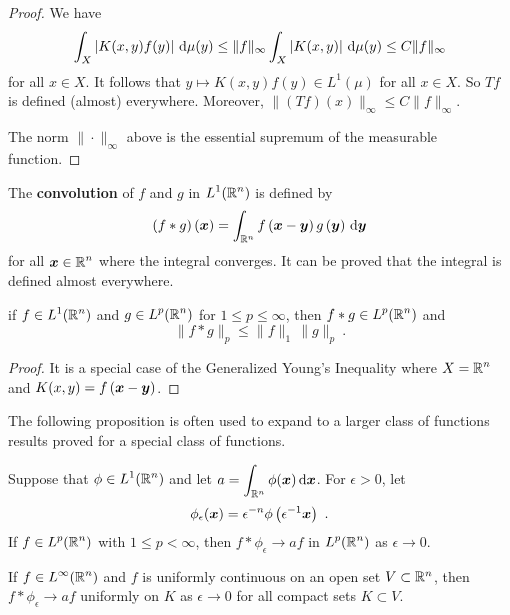 \begin{proof}
 We have
\[
\int_X \left| K(x,y)f(y)\right| \,\mathrm{d}{\mu(y)}
\leq \|f\|_\infty \int_X \left| K(x,y)\right| \,\mathrm{d}{\mu(y)}
\leq C \|f\|_\infty
\]
for all $x\in X$.
It follows that $\displaystyle y \mapsto K(x,y)f(y) \in L^1(\mu)$ for
all $x\in X$.  So $Tf$ is defined (almost) everywhere.  Moreover,
$\displaystyle \| (Tf)(x)\|_\infty \leq C \| f\|_\infty$.

The norm $\| \cdot \|_\infty$ above is the essential supremum of the
measurable function.
\end{proof}

The {\bfseries convolution} of $f$ and $g$ in
$\displaystyle L^1(\mathbb{R}^n)$ is defined by
\[
(f\ast g)\left({\bm{x}}\right) = \int_{\mathbb{R}^n}
f\left({\bm{x}} - {\bm{y}}\right)  g\left({\bm{y}}\right) \,\mathrm{d}{{\bm{y}}}
\]
for all $\displaystyle {\bm{x}} \in \mathbb{R}^n$ where the integral
converges.  It can be proved that the integral is defined almost
everywhere.

\begin{theorem} \label{distr_sp_young}
if $\displaystyle f \in L^1(\mathbb{R}^n)$ and $\displaystyle g\in L^p(\mathbb{R}^n)$
for $1\leq p \leq \infty$, then $\displaystyle f\ast g \in L^p(\mathbb{R}^n)$ and
\[
\| f\ast g \|_p \leq \|f \|_1 \, \|g\|_p \ .
\]
\end{theorem}

\begin{proof}
It is a special case of the Generalized Young's Inequality where
$\displaystyle X=\mathbb{R}^n$ and $K(x,y) = f\left({\bm{x}}-{\bm{y}}\right)$.
\end{proof}

The following proposition is often used to expand to a larger class of
functions results proved for a special class of functions.

\begin{prop} \label{distr_limit_convol}
Suppose that $\displaystyle \phi \in L^1(\mathbb{R}^n)$ and let
$\displaystyle a = \int_{\mathbb{R}^n} \phi({\bm{x}})\,\mathrm{d}{{\bm{x}}}$.  For
$\epsilon >0$, let
\[
\phi_\epsilon({\bm{x}}) = \epsilon^{-n}
\phi\left(\epsilon^{-1}{\bm{x}}\right) \ .
\]
If $\displaystyle f \in L^p(\mathbb{R}^n)$ with $1 \leq p < \infty$, then
$\displaystyle f\ast \phi_\epsilon \rightarrow a f$ in
$\displaystyle L^p(\mathbb{R}^n)$ as $\epsilon \rightarrow 0$.

If $\displaystyle f \in L^\infty(\mathbb{R}^n)$ and $f$ is uniformly continuous on
an open set $V\subset \mathbb{R}^n$, then
$\displaystyle f\ast \phi_\epsilon \rightarrow a f$ uniformly on
$K$ as $\epsilon \rightarrow 0$ for all compact sets $K\subset V$.
\end{prop}

